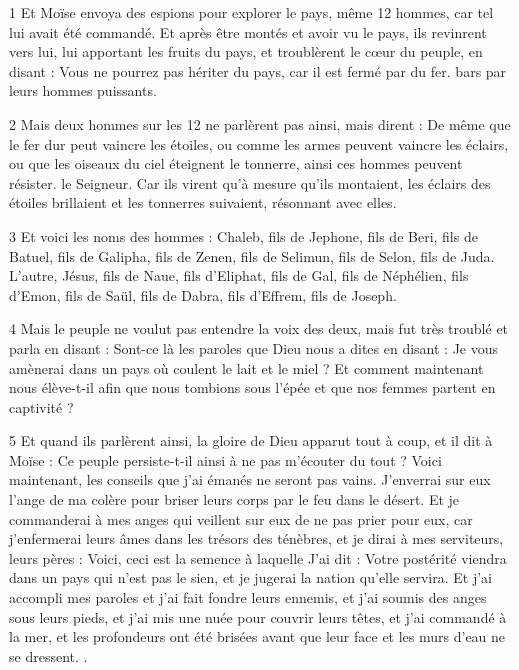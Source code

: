 \par 1 Et Moïse envoya des espions pour explorer le pays, même 12 hommes, car tel lui avait été commandé. Et après être montés et avoir vu le pays, ils revinrent vers lui, lui apportant les fruits du pays, et troublèrent le cœur du peuple, en disant : Vous ne pourrez pas hériter du pays, car il est fermé par du fer. bars par leurs hommes puissants.

\par 2 Mais deux hommes sur les 12 ne parlèrent pas ainsi, mais dirent : De même que le fer dur peut vaincre les étoiles, ou comme les armes peuvent vaincre les éclairs, ou que les oiseaux du ciel éteignent le tonnerre, ainsi ces hommes peuvent résister. le Seigneur. Car ils virent qu'à mesure qu'ils montaient, les éclairs des étoiles brillaient et les tonnerres suivaient, résonnant avec elles.

\par 3 Et voici les noms des hommes : Chaleb, fils de Jephone, fils de Beri, fils de Batuel, fils de Galipha, fils de Zenen, fils de Selimun, fils de Selon, fils de Juda. L'autre, Jésus, fils de Naue, fils d'Eliphat, fils de Gal, fils de Néphélien, fils d'Emon, fils de Saül, fils de Dabra, fils d'Effrem, fils de Joseph.

\par 4 Mais le peuple ne voulut pas entendre la voix des deux, mais fut très troublé et parla en disant : Sont-ce là les paroles que Dieu nous a dites en disant : Je vous amènerai dans un pays où coulent le lait et le miel ? Et comment maintenant nous élève-t-il afin que nous tombions sous l'épée et que nos femmes partent en captivité ?

\par 5 Et quand ils parlèrent ainsi, la gloire de Dieu apparut tout à coup, et il dit à Moïse : Ce peuple persiste-t-il ainsi à ne pas m'écouter du tout ? Voici maintenant, les conseils que j'ai émanés ne seront pas vains. J'enverrai sur eux l'ange de ma colère pour briser leurs corps par le feu dans le désert. Et je commanderai à mes anges qui veillent sur eux de ne pas prier pour eux, car j'enfermerai leurs âmes dans les trésors des ténèbres, et je dirai à mes serviteurs, leurs pères : Voici, ceci est la semence à laquelle J'ai dit : Votre postérité viendra dans un pays qui n'est pas le sien, et je jugerai la nation qu'elle servira. Et j'ai accompli mes paroles et j'ai fait fondre leurs ennemis, et j'ai soumis des anges sous leurs pieds, et j'ai mis une nuée pour couvrir leurs têtes, et j'ai commandé à la mer, et les profondeurs ont été brisées avant que leur face et les murs d'eau ne se dressent. .

